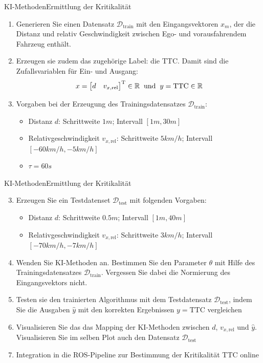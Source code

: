 \documentclass[169, handout	]{THIbeamer} %
\begin{document}
	\begin{frame}{KI-Methoden}{Ermittlung der Kritikalität}
		\begin{enumerate}
			\item Generieren Sie einen Datensatz $\mathcal{D}_\text{train}$ mit den Eingangsvektoren $x_m$, der die Distanz und relativ Geschwindigkeit zwischen Ego- und vorausfahrendem Fahrzeug enthält. 
			\item Erzeugen sie zudem das zugehörige Label: die TTC. Damit sind die Zufallsvariablen für Ein- und Ausgang:
		\begin{equation}
			x = 			
			\begin{bmatrix}
				d & v_{x,\text{rel}}
			\end{bmatrix}
			^{\text{T}} \in \mathbb{R} 
			\hspace{0.2 cm}
			\text{und}
			\hspace{0.2 cm}			
			y = \text{TTC} \in \mathbb{R}
		\end{equation}
			\item[] Vorgaben bei der Erzeugung des Trainingsdatensatzes $\mathcal{D}_{\text{train}}$:
			\begin{itemize}
				\item Distanz $d$: Schrittweite $1m$; Intervall $[1m, 30m]$ 
				\item Relativgeschwindigkeit $v_{x,\text{rel}}$: Schrittweite $5 km/h$; Intervall $[-60 km/h, -5 km/h]$
				\item $\tau = 60s$
			\end{itemize}			 
		\end{enumerate}
	\end{frame}
	\begin{frame}{KI-Methoden}{Ermittlung der Kritikalität}
		\begin{enumerate}
			\setcounter{enumi}{2}
			\item Erzeugen Sie ein Testdatenset $\mathcal{D}_{\text{test}}$ mit folgenden Vorgaben:
			\begin{itemize}
				\item Distanz $d$: Schrittweite $0.5m$; Intervall $[1m, 40m]$ 
				\item Relativgeschwindigkeit $v_{x,\text{rel}}$: Schrittweite $3 km/h$; Intervall $[-70 km/h, -7 km/h]$
			\end{itemize}
			\item Wenden Sie KI-Methoden an. Bestimmen Sie den Parameter $\theta$ mit Hilfe des Trainingsdatensatzes $\mathcal{D}_\text{train}$. Vergessen Sie dabei die Normierung des Eingangsvektors nicht.
			\item Testen sie den trainierten Algorithmus mit dem Testdatensatz $\mathcal{D}_\text{test}$, indem Sie die Ausgaben $\hat{y}$ mit den korrekten Ergebnissen $y = \text{TTC}$ vergleichen
			\item Visualisieren Sie das das Mapping der KI-Methoden zwischen $d$, $v_{x,\text{rel}}$ und $\hat{y}$. Visualisieren Sie im selben Plot auch den Datensatz $\mathcal{D}_\text{test}$
			\item Integration in die ROS-Pipeline zur Bestimmung der Kritikalität TTC online
		\end{enumerate}
	\end{frame}
			
\end{document}
